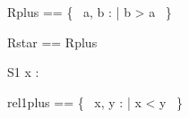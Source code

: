 \documentclass[a4paper,10pt,fleqn]{article}
\begin{document}
\begin{zed}
Rplus == \{~ a, b : \nat | b > a ~\}
\end{zed}

\begin{zed}
Rstar == Rplus \cup \id \nat
\end{zed}

\begin{schema}{S1}
x : \nat
\end{schema}

\begin{zed}
rel1plus == \{~ x, y : \nat | x < y ~\}
\end{zed}
\end{document}
